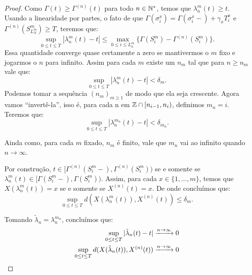 \begin{proof}
  Como $\Gamma(t) \geq \Gamma^{(n)}(t)$ para todo $n \in {\mathbb{N^*}}$, temos
  que $\lambda_n^m(t) \geq t$. Usando a linearidade por partes, o fato
  de que $\Gamma(\sigma^x_i) = \Gamma(\sigma_i^x-) + \gamma_x T^x_i$ e
  $\Gamma^{(n)}(S^m_{L_N^m}) \geq T$, teremos que:
  \begin{displaymath}
    \sup_{0 \leq t \leq T} |\lambda_n^m(t) - t| \leq
    \max_{0 \leq i \leq L_n^m} \{ \Gamma(S_i^m) -
    \Gamma^{(n)}(S_i^m)\}.
  \end{displaymath}
  Essa quantidade converge quase certamente a zero se mantivermos o
  $m$ fixo e jogarmos o $n$ para infinito. Assim para cada $m$ existe
  um $n_m$ tal que para $n \geq n_m$ vale que:
  \begin{displaymath}
    \sup_{0 \leq t \leq T} |\lambda_n^m(t) - t| < \delta_m.
  \end{displaymath}
  Podemos tomar a sequência $(n_m)_{m \geq 1}$ de modo que ela seja
  crescente. Agora vamos ``invertê-la'', isso é, para cada n em ${\mathbb{Z}}
  \cap [n_{i-1}, n_i)$, definimos $m_n = i$. Teremos que:
  \begin{displaymath}
    \sup_{0 \leq t \leq T} |\lambda_n^{m_n}(t) - t| < \delta_{m_n}.
  \end{displaymath}

  Ainda como, para cada $m$ fixado, $n_m$ é finito, vale que $m_n$ vai
  ao infinito quando $n \to \infty$.
  
  Por construção, $t \in [\Gamma^{(n)}(S_{i}^m-),
  \Gamma^{(n)}(S_{i}^m))$ se e somente se $\lambda_n^m(t) \in
  [\Gamma(S_{i}^m-), \Gamma(S_{i}^m))$. Assim, para cada $x \in \{1,
  \ldots, m\}$, temos que $X(\lambda_n^m(t)) = x$ se e somente se
  $X^{(n)}(t) = x$. De onde concluímos que:
  \begin{displaymath}
    \sup_{0 \leq t \leq T} d\left(X(\lambda_n^m(t)), X^{(n)} (t)\right)
    \leq \delta_m.
  \end{displaymath}

  Tomando $\tilde{\lambda}_n = \lambda_n^{m_n}$, concluímos que:
  \begin{align*}
    \sup_{0 \leq t \leq T} |\tilde{\lambda}_n(t) - t|
    &\xrightarrow{n\to\infty} 0 \\
    \sup_{0 \leq t \leq T} d(X(\tilde{\lambda}_n(t)), X^{(n)}(t))
    &\xrightarrow{n\to\infty} 0
    \qedhere
  \end{align*}
\end{proof}

